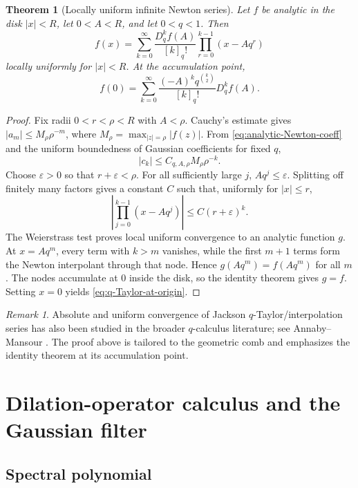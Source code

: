 \documentclass[11pt,oneside]{article}
\numberwithin{equation}{section}
\newtheorem{theorem}{Theorem}[section]
\theoremstyle{definition}
\theoremstyle{remark}
\newtheorem{remark}[remark]{Remark}
\begin{document}
\begin{theorem}[Locally uniform infinite Newton series]
Let $f$ be analytic in the disk $|x|<R$, let $0<A<R$, and let $0<q<1$.
Then
\begin{equation}
 f(x)=\sum_{k=0}^{\infty}
 \frac{D_q^kf(A)}{[k]_q!}
 \prod_{r=0}^{k-1}(x-Aq^r)
 \label{eq:infinite-Newton}
\end{equation}
locally uniformly for $|x|<R$.  At the accumulation point,
\begin{equation}
 f(0)=\sum_{k=0}^{\infty}
 \frac{(-A)^kq^{\binom{k}{2}}}{[k]_q!}D_q^kf(A).
 \label{eq:q-Taylor-at-origin}
\end{equation}
\end{theorem}

\begin{proof}
Fix radii $0<r<\rho<R$ with $A<\rho$.  Cauchy's estimate gives
$|a_m|\le M_\rho\rho^{-m}$, where
$M_\rho=\max_{|z|=\rho}|f(z)|$.  From
\eqref{eq:analytic-Newton-coeff} and the uniform boundedness of Gaussian
coefficients for fixed $q$,
\[
 |c_k|\le C_{q,A,\rho}M_\rho\rho^{-k}.
\]
Choose $\varepsilon>0$ so that $r+\varepsilon<\rho$.  For all sufficiently
large $j$, $Aq^j\le\varepsilon$.  Splitting off finitely many factors gives a
constant $C$ such that, uniformly for $|x|\le r$,
\[
 \left|\prod_{j=0}^{k-1}(x-Aq^j)\right|
 \le C(r+\varepsilon)^k.
\]
The Weierstrass test proves local uniform convergence to an analytic function
$g$.  At $x=Aq^m$, every term with $k>m$ vanishes, while the first $m+1$ terms
form the Newton interpolant through that node.  Hence $g(Aq^m)=f(Aq^m)$ for all
$m$.  The nodes accumulate at $0$ inside the disk, so the identity theorem
gives $g=f$.  Setting $x=0$ yields \eqref{eq:q-Taylor-at-origin}.
\end{proof}

\begin{remark}
Absolute and uniform convergence of Jackson $q$-Taylor/interpolation series has
also been studied in the broader $q$-calculus literature; see
Annaby--Mansour \cite{AnnabyMansour}.  The proof above is tailored to the
geometric comb and emphasizes the identity theorem at its accumulation point.
\end{remark}

\section{Dilation-operator calculus and the Gaussian filter}
\label{sec:operator}

\subsection{Spectral polynomial}
\end{document}
